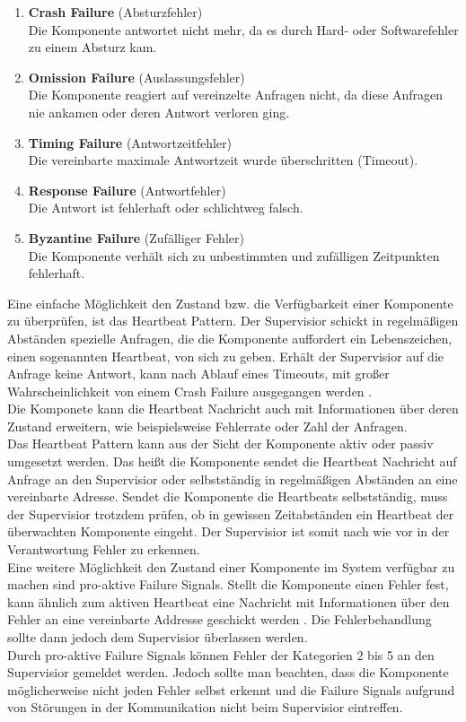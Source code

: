 \begin{enumerate}
\item \textbf{Crash Failure} (Absturzfehler)\\
Die Komponente antwortet nicht mehr, da es durch Hard- oder Softwarefehler zu einem Absturz kam.
\item \textbf{Omission Failure} (Auslassungsfehler)\\
Die Komponente reagiert auf vereinzelte Anfragen nicht, da diese Anfragen nie ankamen oder deren Antwort verloren ging.
\item \textbf{Timing Failure} (Antwortzeitfehler)\\
Die vereinbarte maximale Antwortzeit wurde überschritten (Timeout).
\item \textbf{Response Failure} (Antwortfehler)\\
Die Antwort ist fehlerhaft oder schlichtweg falsch.
\item \textbf{Byzantine Failure} (Zufälliger Fehler)\\
Die Komponente verhält sich zu unbestimmten und zufälligen Zeitpunkten fehlerhaft.
\end{enumerate}

Eine einfache Möglichkeit den Zustand bzw. die Verfügbarkeit einer Komponente zu überprüfen, ist das Heartbeat Pattern. Der Supervisior schickt in regelmäßigen Abständen spezielle Anfragen, die die Komponente auffordert ein Lebenszeichen, einen sogenannten Heartbeat, von sich zu geben. Erhält der Supervisior auf die Anfrage keine Antwort, kann nach Ablauf eines Timeouts, mit großer Wahrscheinlichkeit von einem Crash Failure ausgegangen werden \cite[S.~200~\&~S.~201]{kuhn_reactive_2015}.\\
Die Komponete kann die Heartbeat Nachricht auch mit Informationen über deren Zustand erweitern, wie beispielsweise Fehlerrate oder Zahl der Anfragen.\\
Das Heartbeat Pattern kann aus der Sicht der Komponente aktiv oder passiv umgesetzt werden. Das heißt die Komponente sendet die Heartbeat Nachricht auf Anfrage an den Supervisior oder selbstständig in regelmäßigen Abständen an eine vereinbarte Adresse. Sendet die Komponente die Heartbeats selbstständig, muss der Supervisior trotzdem prüfen, ob in gewissen Zeitabständen ein Heartbeat der überwachten Komponente eingeht. Der Supervisior ist somit nach wie vor in der Verantwortung Fehler zu erkennen.\\

Eine weitere Möglichkeit den Zustand einer Komponente im System verfügbar zu machen sind pro-aktive Failure Signals. Stellt die Komponente einen Fehler fest, kann ähnlich zum aktiven Heartbeat eine Nachricht mit Informationen über den Fehler an eine vereinbarte Addresse geschickt werden \cite[S.~201~\&~S.202]{kuhn_reactive_2015}. Die Fehlerbehandlung sollte dann jedoch dem Supervisior überlassen werden.\\
Durch pro-aktive Failure Signals können Fehler der Kategorien 2 bis 5 an den Supervisior gemeldet werden. Jedoch sollte man beachten, dass die Komponente möglicherweise nicht jeden Fehler selbst erkennt und die Failure Signals aufgrund von Störungen in der Kommunikation nicht beim Supervisior eintreffen.\\

